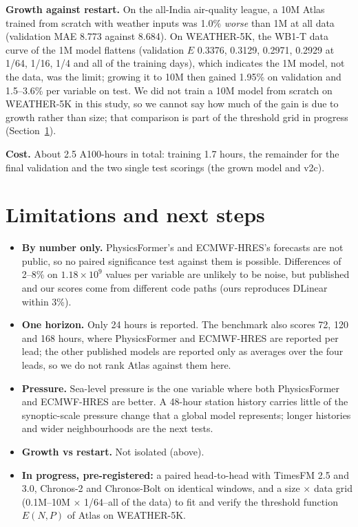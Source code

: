 \documentclass{article}
\begin{document}
\textbf{Growth against restart.} On the all-India air-quality league, a 10M Atlas trained from scratch with weather
inputs was 1.0\% \emph{worse} than 1M at all data (validation MAE 8.773 against 8.684). On WEATHER-5K, the WB1-T data
curve of the 1M model flattens (validation $E$ 0.3376, 0.3129, 0.2971, 0.2929 at 1/64, 1/16, 1/4 and all of the
training days), which indicates the 1M model, not the data, was the limit; growing it to 10M then gained 1.95\% on
validation and 1.5--3.6\% per variable on test. We did not train a 10M model from scratch on WEATHER-5K in this study, so
we cannot say how much of the gain is due to growth rather than size; that comparison is part of the threshold grid in
progress (Section~\ref{sec:limits}).

\textbf{Cost.} About 2.5 A100-hours in total: training 1.7 hours, the remainder for the final validation and the
two single test scorings (the grown model and v2c).

\section{Limitations and next steps}
\label{sec:limits}
\begin{itemize}
\item \textbf{By number only.} PhysicsFormer's and ECMWF-HRES's forecasts are not public, so no paired significance
test against them is possible. Differences of 2--8\% on $1.18\times10^9$ values per variable are unlikely to be noise,
but published and our scores come from different code paths (ours reproduces DLinear within 3\%).
\item \textbf{One horizon.} Only 24 hours is reported. The benchmark also scores 72, 120 and 168 hours, where
PhysicsFormer and ECMWF-HRES are reported per lead; the other published models are reported only as averages over the
four leads, so we do not rank Atlas against them here.
\item \textbf{Pressure.} Sea-level pressure is the one variable where both PhysicsFormer and ECMWF-HRES are better. A
48-hour station history carries little of the synoptic-scale pressure change that a global model represents; longer
histories and wider neighbourhoods are the next tests.
\item \textbf{Growth vs restart.} Not isolated (above).
\item \textbf{In progress, pre-registered:} a paired head-to-head with TimesFM 2.5 and 3.0, Chronos-2 and Chronos-Bolt
on identical windows, and a size $\times$ data grid (0.1M--10M $\times$ 1/64--all of the data) to fit and verify the
threshold function $E(N,P)$ of Atlas on WEATHER-5K.
\end{itemize}
\end{document}

